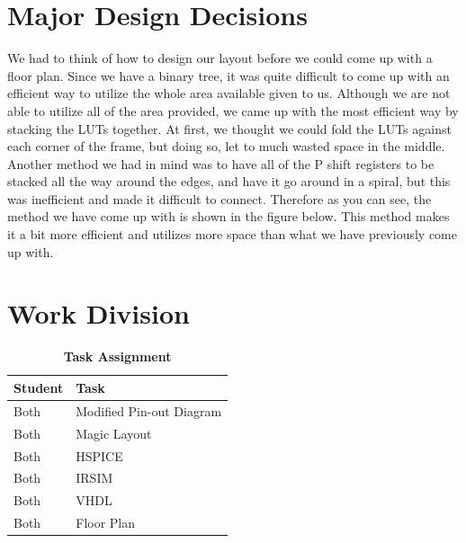\documentclass[a4paper]{article}
\begin{document}
\section{\textbf{Major Design Decisions}}
    We had to think of how to design our layout before we could come up with a floor plan. Since we have a binary
    tree, it was quite difficult to come up with an efficient way to utilize the whole area available given to us.
    Although we are not able to utilize all of the area provided, we came up with the most efficient way by
    stacking the LUTs together. At first, we thought we could fold the LUTs against each corner of the frame, but
    doing so, let to much wasted space in the middle. Another method we had in mind was to have all of the P shift
    registers to be stacked all the way around the edges, and have it go around in a spiral, but this was inefficient
    and made it difficult to connect. Therefore as you can see, the method we have come up with is shown in the figure below.
    This method makes it a bit more efficient and utilizes more space than what we have previously come up with.

\section{\textbf{Work Division}}
    \begin{table}[H]
        \centering
        \begin{tabular}{l | p{8cm}}
            \hline
            \textbf{Student}   & \textbf{Task} \\ \hline
            \midrule
                Both        & Modified Pin-out Diagram \\
                Both        & Magic Layout \\
                Both        & HSPICE \\
                Both        & IRSIM \\
                Both        & VHDL \\
                Both        & Floor Plan
        \end{tabular}
        \caption{\textbf{Task Assignment}}
    \end{table}
\end{document}
